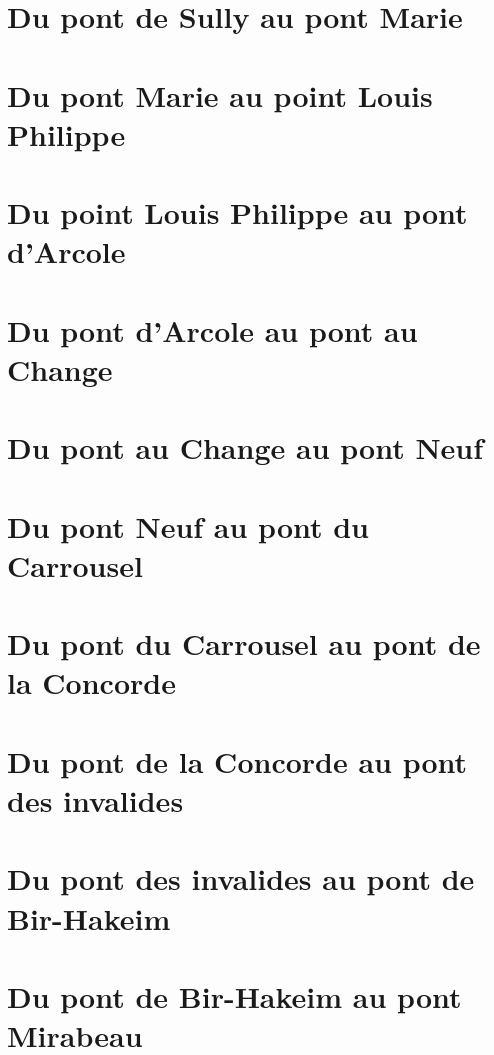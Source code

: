 \documentclass[11pt]{article}
\begin{document}
\section*{Du pont de Sully au pont Marie}

\section*{Du pont Marie au point Louis Philippe}

\section*{Du point Louis Philippe au pont d'Arcole}

\section*{Du pont d'Arcole au pont au Change}

\section*{Du pont au Change au pont Neuf}

\section*{Du pont Neuf au pont du Carrousel}

\section*{Du pont du Carrousel au pont de la Concorde}

\section*{Du pont de la Concorde au pont des invalides}

\section*{Du pont des invalides au pont de Bir-Hakeim}

\section*{Du pont de Bir-Hakeim au pont Mirabeau}
\end{document}

